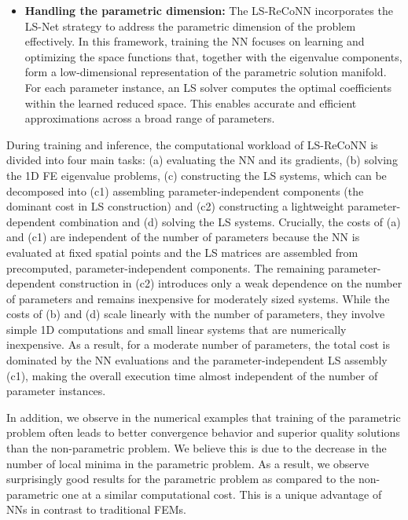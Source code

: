 \documentclass[oneside]{article}
\newcounter{reviewer}
\newcounter{point}[reviewer]
\begin{document}
\begin{itemize}
    \item \textbf{Handling the parametric dimension:} The LS-ReCoNN incorporates the LS-Net strategy to address the parametric dimension of the problem effectively. In this framework, training the NN focuses on learning and optimizing the space functions that, together with the eigenvalue components, form a low-dimensional representation of the parametric solution manifold. For each parameter instance, an LS solver computes the optimal coefficients within the learned reduced space. This enables accurate and efficient approximations across a broad range of parameters.

    
    
    
\end{itemize}




\noindent During training and inference, the computational workload of LS-ReCoNN is divided into four main tasks: (a) evaluating the NN and its gradients, (b) solving the 1D FE eigenvalue problems, (c) {constructing the LS systems, which can be decomposed into (c1) assembling parameter-independent components (the dominant cost in LS construction) and (c2) constructing a lightweight parameter-dependent combination} and (d) solving the LS systems. Crucially, the costs of (a) and {(c1)} are independent of the number of parameters because the NN is evaluated at fixed spatial points and the LS matrices are assembled from precomputed, parameter-independent components. The remaining parameter-dependent construction in (c2) introduces only a weak dependence on the number of parameters and remains inexpensive for moderately sized systems. While the costs of (b) and (d) scale linearly with the number of parameters, they involve simple 1D computations and small linear systems that are numerically inexpensive. As a result, for a moderate number of parameters, the total cost is dominated by the {NN evaluations and the parameter-independent LS assembly (c1),} making the overall execution time almost independent of the number of parameter instances.


In addition, we observe in the numerical examples that training of the parametric problem often leads to better convergence behavior and superior quality solutions than the non-parametric problem. We believe this is due to the decrease in the number of local minima in the parametric problem. As a result, we observe surprisingly good results for the parametric problem as compared to the non-parametric one at a similar computational cost. This is a unique advantage of NNs in contrast to traditional FEMs.
\end{document}
